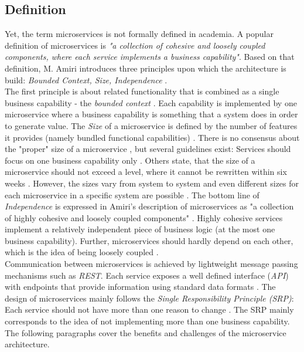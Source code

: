 \subsection{Definition}
Yet, the term microservices is not formally defined in academia. A popular definition of microservices is  \textit{"a collection of cohesive and loosely coupled components, where each service implements a business capability"}\cite{ObjectAwareAmiri}. Based on that definition, M. Amiri introduces three principles upon which the architecture is build: \textit{Bounded Context, Size, Independence} \cite{ObjectAwareAmiri}. \\
The first principle is about related functionality that is combined as a single business capability - the  \textit{bounded context} \cite{FunctionalDecompositionHeinrich}. Each capability is implemented by one microservice where a business capability is something that a system does in order to generate value\cite{DomainEngineeringMunezero}. The \textit{Size} of a microservice is defined by the number of features it provides (namely bundled functional capabilities)  \cite{WorkloadbasedClustering}. There is no consensus about the "proper" size of a microservice \cite{DomainEngineeringMunezero}, but several guidelines exist: Services should focus on one business capability only \cite{ObjectAwareAmiri}. Others state, that the size of a microservice should not exceed a level, where it cannot be rewritten within six weeks \cite{WorkloadbasedClustering}. However, the sizes vary from system to system \cite{FunctionalDecompositionHeinrich} and even different sizes for each microservice in a specific system are possible \cite{DomainEngineeringMunezero}. The bottom line of \textit{Independence} is expressed in Amiri's description of microservices as "a collection of highly cohesive and loosely coupled components" \cite{ObjectAwareAmiri}. Highly cohesive services implement a relatively independent piece of business logic (at the most one business capability). Further, microservices should hardly depend on each other, which is the idea of being loosely coupled \cite{DataflowDrivenChen}.\\
Communication between microservices is achieved by lightweight message passing mechanisms such as \textit{REST}. Each service exposes a well defined interface (\textit{API}) with endpoints that provide information using standard data formats \cite{FunctionalDecompositionHeinrich}. 
The design of microservices mainly follows the \textit{Single Responsibility Principle (SRP)}: Each service should not have more than one reason to change \cite{TowardsUnderstandingEvolution}. The SRP mainly corresponds to the idea of not implementing more than one business capability.
The following paragraphs cover the benefits and challenges of the microservice architecture.





